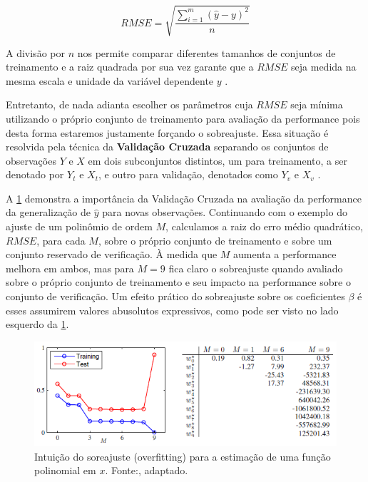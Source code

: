 \begin{equation}
RMSE = \sqrt{\dfrac{\sum_{i=1}^{m} (\hat{y}-y)^2}{n}}
\end{equation} 

A divisão por $ n $ nos permite comparar diferentes tamanhos de conjuntos de treinamento e a raiz quadrada por sua vez garante que a $ RMSE $ seja medida na mesma escala e unidade da variável dependente $ y $ \cite[p.7]{Bishop}. 

Entretanto, de nada adianta escolher os parâmetros cuja $ RMSE $ seja mínima utilizando o próprio conjunto de treinamento para avaliação da performance pois desta forma estaremos justamente forçando o sobreajuste. Essa situação é resolvida pela técnica da \textbf{Validação Cruzada} separando os conjuntos de observações $ Y $ e $ X $ em dois subconjuntos distintos, um para treinamento, a ser denotado por $ Y_t $ e $ X_t $, e outro para validação, denotados como $ Y_v $ e $ X_v $ \cite[p.32]{Bishop}.                                                                                                             

A \cref{fig:bishop_overfit_error} demonstra a importância da Validação Cruzada na avaliação da performance da generalização de $ \hat{y} $ para novas observações. Continuando com o exemplo do ajuste de um polinômio de ordem  $ M $, calculamos a raiz do erro médio quadrático, $ RMSE $, para cada $ M $, sobre o próprio conjunto de treinamento e sobre um conjunto reservado de verificação. À medida que $ M $ aumenta a performance melhora em ambos, mas para $ M=9 $ fica claro o sobreajuste quando avaliado sobre o próprio conjunto de treinamento e seu impacto na performance sobre o conjunto de verificação. Um efeito prático do sobreajuste sobre os coeficientes $ \beta $ é esses assumirem valores abusolutos expressivos, como pode ser visto no lado esquerdo da \cref{fig:bishop_overfit_error}.

\begin{figure}[h!]
\centering
\includegraphics[width=1\linewidth]{img/bishop_overfit_error}
\caption[Intuição do sobreajuste (overfitting)]{Intuição do soreajuste (overfitting) para a estimação de uma função polinomial em $x$. Fonte:\cite[p.8]{Bishop}, adaptado.}
\label{fig:bishop_overfit_error}
\end{figure}


